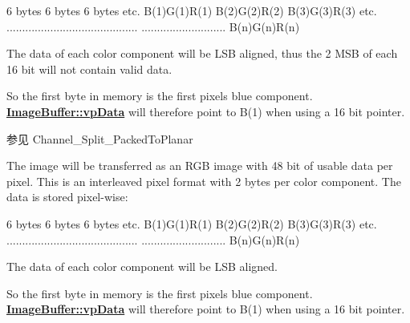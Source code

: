 \begin{Desc}
\begin{description}
\begin{DoxyCode}
6 bytes        6 bytes        6 bytes      etc.
B(1)G(1)R(1)   B(2)G(2)R(2)   B(3)G(3)R(3) etc.
..........................................
...........................   B(n)G(n)R(n)
\end{DoxyCode}


The data of each color component will be L\+S\+B aligned, thus the 2 M\+S\+B of each 16 bit will not contain valid data.

So the first byte in memory is the first pixels blue component. {\bfseries \hyperlink{struct_image_buffer_ab67c9c21d749e786302c848b508e0673}{Image\+Buffer\+::vp\+Data}} will therefore point to B(1) when using a 16 bit pointer.

\begin{DoxySeeAlso}{参见}
Channel\+\_\+\+Split\+\_\+\+Packed\+To\+Planar 
\end{DoxySeeAlso}
\item[{\em 
\hypertarget{group___common_interface_gga02e0fc32ff10e0bc0f2e8b9c321d65c9aa3eedddf37019677aa6497a2f35be6d7}{idpf\+R\+G\+B161616\+Packed}\label{group___common_interface_gga02e0fc32ff10e0bc0f2e8b9c321d65c9aa3eedddf37019677aa6497a2f35be6d7}
}]The image will be transferred as an R\+G\+B image with 48 bit of usable data per pixel. This is an interleaved pixel format with 2 bytes per color component. The data is stored pixel-\/wise\+:


\begin{DoxyCode}
6 bytes        6 bytes        6 bytes      etc.
B(1)G(1)R(1)   B(2)G(2)R(2)   B(3)G(3)R(3) etc.
..........................................
...........................   B(n)G(n)R(n)
\end{DoxyCode}


The data of each color component will be L\+S\+B aligned.

So the first byte in memory is the first pixels blue component. {\bfseries \hyperlink{struct_image_buffer_ab67c9c21d749e786302c848b508e0673}{Image\+Buffer\+::vp\+Data}} will therefore point to B(1) when using a 16 bit pointer.


\end{description}
\end{Desc}
